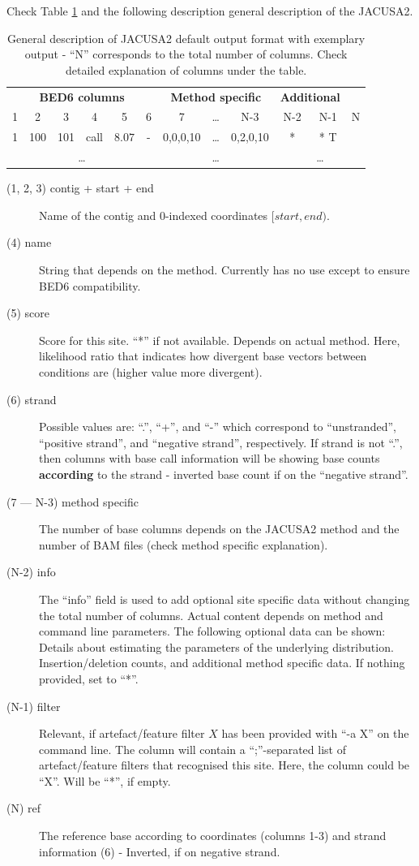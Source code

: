 \documentclass[10pt,a4paper,final]{article}
\begin{document}
Check Table \ref{tbl:general_output} and the following description general description of the JACUSA2.
\begin{table}[ht]
  \centering 
  \caption{General description of JACUSA2 default output format with exemplary 
  output - ``N'' corresponds to the total number of columns. Check detailed explanation of columns
  under the table.}
  \label{tbl:general_output}
{\small
\begin{tabular}{cccccc|ccc|ccc}
  \multicolumn{6}{c|}{\textbf{BED6 columns}} & \multicolumn{3}{c}{\textbf{Method specific}} & \multicolumn{2}{c}{\textbf{Additional}} \\
  1 & 2 & 3 & 4 & 5 & 6 & 7 & \ldots & N-3 & N-2 & N-1 & N \\
  \hline
  1 & 100 & 101 & call & $8.07$ & - & 0,0,0,10 & \ldots & 0,2,0,10 & * & * T \\
  \multicolumn{6}{c|}{\ldots} & \multicolumn{3}{c}{\ldots} & \multicolumn{3}{c}{\ldots} \\
\end{tabular}}
\end{table}
\begin{description}
  \item[(1, 2, 3) contig + start + end] Name of the contig and 0-indexed coordinates $[start, end)$.
  \item[(4) name] String that depends on the method. Currently has no use except to ensure BED6 compatibility.
  \item[(5) score] Score for this site. ``*'' if not available. Depends on actual method. Here, 
  likelihood ratio that indicates how divergent base vectors between conditions are (higher value more divergent).
  \item[(6) strand] Possible values are: ``.'', ``+'', and ``-'' which correspond to ``unstranded'',
  ``positive strand'', and ``negative strand'', respectively. If strand is not ``.'', then columns
  with base call information will be showing base counts \textbf{according} to the strand - inverted 
  base count if on the ``negative strand''.
  \item[(7 --- N-3) method specific] The number of base columns depends on the JACUSA2 method and
  the number of BAM files (check method specific explanation).
  \item[(N-2) info] The ``info'' field is used to add optional site specific data without changing 
  the total number of columns. Actual content depends on method and command line parameters. 
  The following optional data can be shown: Details about estimating the parameters 
  of the underlying distribution. Insertion/deletion counts, and additional method 
  specific data. If nothing provided, set to ``*''. 
  \item[(N-1) filter] Relevant, if artefact/feature filter $X$ has been provided with 
  ``-a X'' on the command line. The column will contain a ``;''-separated list of artefact/feature 
  filters that recognised this site. Here, the column could be ``X''. Will be ``*'', if empty.
  \item[(N) ref] The reference base according to coordinates (columns 1-3) and strand 
  information (6) - Inverted, if on negative strand.
\end{description}
\end{document}
